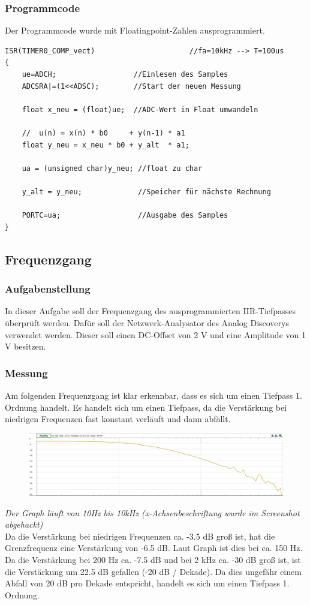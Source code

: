\documentclass{article}
\begin{document}
\subsubsection{Programmcode}
Der Programmcode wurde mit Floatingpoint-Zahlen ausprogrammiert.
\begin{verbatim}
ISR(TIMER0_COMP_vect)                      //fa=10kHz --> T=100us
{ 
    ue=ADCH;                  //Einlesen des Samples
    ADCSRA|=(1<<ADSC);        //Start der neuen Messung
    
    float x_neu = (float)ue;  //ADC-Wert in Float umwandeln
    
    //  u(n) = x(n) * b0     + y(n-1) * a1
    float y_neu = x_neu * b0 + y_alt  * a1;
    
    ua = (unsigned char)y_neu; //float zu char
    
    y_alt = y_neu;             //Speicher für nächste Rechnung

    PORTC=ua;                  //Ausgabe des Samples
}
\end{verbatim}
\newpage
\subsection{Frequenzgang}
\subsubsection{Aufgabenstellung}
In dieser Aufgabe soll der Frequenzgang des ausprogrammierten IIR-Tiefpasses überprüft werden. Dafür soll der Netzwerk-Analysator des Analog Discoverys verwendet werden. Dieser soll einen DC-Offset von 2 V und eine Amplitude von 1 V besitzen.

\subsubsection{Messung}
Am folgenden Frequenzgang ist klar erkennbar, dass es sich um einen Tiefpass 1. Ordnung handelt. Es handelt sich um einen Tiefpass, da die Verstärkung bei niedrigen Frequenzen fast konstant verläuft und dann abfällt.
\begin{figure}[h]
    \centering
    \includegraphics[width=0.5\linewidth]{img/Bode_01.png}
\end{figure}
\textit{Der Graph läuft von 10Hz bis 10kHz (x-Achsenbeschriftung wurde im Screenshot abgehackt)}\\
Da die Verstärkung bei niedrigen Frequenzen ca. -3.5 dB groß ist, hat die Grenzfrequenz eine Verstärkung von -6.5 dB. Laut Graph ist dies bei ca. 150 Hz. Da die Verstärkung bei 200 Hz ca. -7.5 dB und bei 2 kHz ca. -30 dB groß ist, ist die Verstärkung um 22.5 dB gefallen (-20 dB / Dekade). Da dies ungefähr einem Abfall von 20 dB pro Dekade entspricht, handelt es sich um einen Tiefpass 1. Ordnung.
\end{document}
